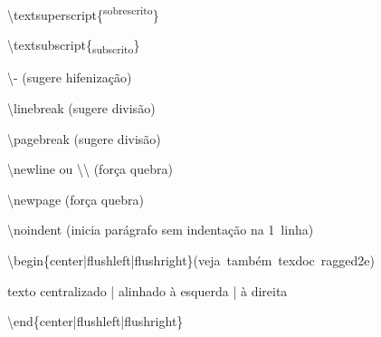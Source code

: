 \documentclass[10pt,twoside,english,brazilian]{article}
\begin{document}
\begin{multicols}{3}
\textbackslash{}textsuperscript\{\textsuperscript{sobrescrito}\}

\textbackslash{}textsubscript\{\textsubscript{subscrito}\}

\textbackslash{}- (sugere hifenização)

\textbackslash{}linebreak (sugere divisão)

\textbackslash{}pagebreak (sugere divisão)

\textbackslash{}newline ou \textbackslash\textbackslash{} (força quebra)

\textbackslash{}newpage (força quebra)

\textbackslash{}noindent (inicia parágrafo sem indentação na
                         1\textordfeminine\ linha)

\textbackslash{}begin\{center|flushleft|flushright\}\quad \mbox{(veja também
                                                    \textsf{texdoc ragged2e})}

\quad texto centralizado | alinhado à esquerda | à direita

\textbackslash{}end\{center|flushleft|flushright\}

\end{multicols}

\printbibliography[
  title=\refname\label{bibliografia}, %
]
\end{document}
